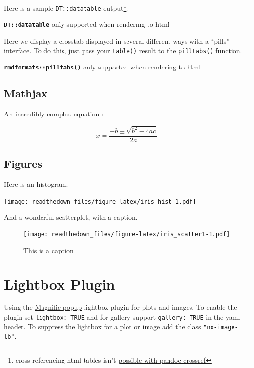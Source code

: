 \documentclass[
]{article}
\begin{document}
Here is a sample \texttt{DT::datatable} output\footnote{cross
  referencing html tables isn't
  \href{https://github.com/lierdakil/pandoc-crossref/issues/122}{possible
  with pandoc-crossref}}.

\textbf{\texttt{DT::datatable}} only supported when rendering to html

Here we display a crosstab displayed in several different ways with a
``pills'' interface. To do this, just pass your \texttt{table()} result
to the \texttt{pilltabs()} function.

\textbf{\texttt{rmdformats::pilltabs()}} only supported when rendering
to html

\hypertarget{mathjax}{%
\subsection{Mathjax}\label{mathjax}}

An incredibly complex equation :

\begin{equation}x = \frac{-b \pm \sqrt{b^2-4ac}}{2a}\label{eq:quadratic_formula}\end{equation}

\hypertarget{figures}{%
\subsection{Figures}\label{figures}}

Here is an histogram.

\texttt{[image: readthedown\_files/figure-latex/iris\_hist-1.pdf]}

And a wonderful scatterplot, with a caption.

\begin{figure}
\hypertarget{fig:iris_scatter1}{%
\centering
\texttt{[image: readthedown\_files/figure-latex/iris\_scatter1-1.pdf]}
\caption{This is a caption}\label{fig:iris_scatter1}
}
\end{figure}

\hypertarget{sec:lb-support}{%
\section{Lightbox Plugin}\label{sec:lb-support}}

Using the \href{http://dimsemenov.com/plugins/magnific-popup/}{Magnific
popup} lightbox plugin for plots and images. To enable the plugin set
\texttt{lightbox:\ TRUE} and for gallery support \texttt{gallery:\ TRUE}
in the yaml header. To suppress the lightbox for a plot or image add the
class \texttt{"no-image-lb"}.
\end{document}
